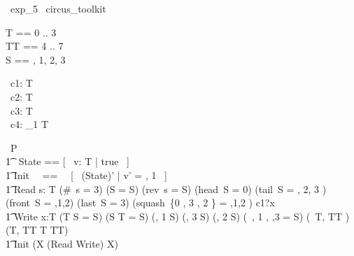 
\begin{zsection}
  \SECTION\ exp\_5 \parents\ circus\_toolkit
\end{zsection}

\begin{zed}
	T == 0 .. 3 \\
	TT == 4 .. 7 \\
    S == , 1, 2, 3 \rangle \\
\end{zed}

\begin{circus}
	\circchannel\ c1: T \\
	\circchannel\ c2: \seq T \\
	\circchannel\ c3: \iseq T \\
	\circchannel\ c4: \seq_1 T \\
\end{circus}

\begin{circus}
    \circprocess\ P \circdef \circbegin \\
        \t1 \circstate\ State == [~ v: \seq T | true ~] \\
        \t1 Init ~~==~~ [~ (State)' | v' = , 1 \rangle ~] \\
        \t1 Read \circdef \circvar s: \seq T \circspot \lcircguard (\#~s = 3) \land (\langle\rangle \cat S = S) \land (rev~s = S) \land (head~S = 0) \land (tail~S = , 2, 3 \rangle) \land (front~S = ,1,2\rangle) \land (last~S = 3) \land (squash~\{0 , 3 , 2 \} = ,1,2 \rangle) \rcircguard \circguard c1?x  \then \Skip \\
        \t1 Write \circdef \circvar x:T \circspot \lcircguard (T \extract S = S) \land (S \filter T = S) \land (, 1 \rangle \prefix S) \land (, 3 \rangle \suffix S) \land (, 2 \rangle \infix S) \land (\dcat~\langle {}, 1 \rangle, ,3 \rangle \rangle = S) \land (\disjoint~\langle T, TT \rangle) \land (\langle T, TT \rangle \partition T \cup TT) \rcircguard \circguard \Skip \\
        \t1 \circspot \lschexpract Init \rschexpract \circseq (\circmu X \circspot (Read \extchoice Write) \circseq X) \\ 
	\circend
\end{circus}

